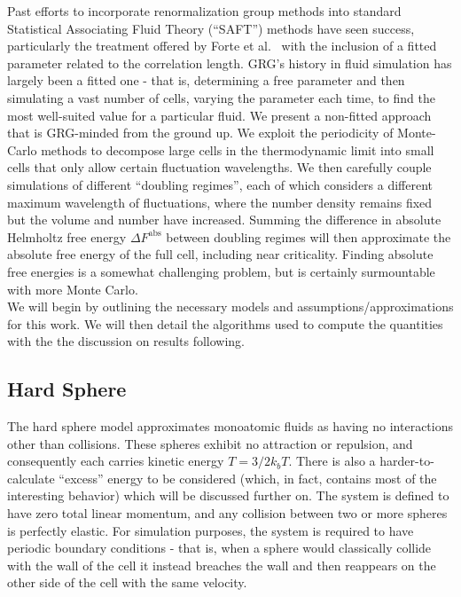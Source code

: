 \documentclass[12pt]{article}
\newcommand{\ignore}[1]{}
\begin{document}
Past efforts to incorporate renormalization group methods into standard Statistical Associating Fluid Theory (``SAFT'') methods have seen success, particularly the treatment offered by Forte et al.~\cite{forte2011application} with the inclusion of a fitted parameter related to the correlation length. GRG's history in fluid simulation has largely been a fitted one - that is, determining a free parameter and then simulating a vast number of cells, varying the parameter each time, to find the most well-suited value for a particular fluid. We present a non-fitted approach that is GRG-minded from the ground up. We exploit the periodicity of Monte-Carlo methods to decompose large cells in the thermodynamic limit into small cells that only allow certain fluctuation wavelengths. We then carefully couple simulations of different ``doubling regimes'', each of which considers a different maximum wavelength of fluctuations, where the number density remains fixed but the volume and number have increased. Summing the difference in absolute Helmholtz free energy $\Delta F^{\text{abs}}$ between doubling regimes will then approximate the absolute free energy of the full cell, including near criticality. Finding absolute free energies is a somewhat challenging problem, but is certainly surmountable with more Monte Carlo. \\
We will begin by outlining the necessary models and assumptions/approximations for this work. We will then detail the algorithms used to compute the quantities with the the discussion on results following. 
\subsection{Hard Sphere}
The hard sphere model approximates monoatomic fluids as having no interactions other than collisions. These spheres exhibit no attraction or repulsion, and consequently each carries kinetic energy $T = 3/2 k_b T$. There is also a harder-to-calculate ``excess'' energy to be considered (which, in fact, contains most of the interesting behavior) which will be discussed further on. The system is defined to have zero total linear momentum, and any collision between two or more spheres is perfectly elastic. For simulation purposes, the system is required to have periodic boundary conditions - that is, when a sphere would classically collide with the wall of the cell it instead breaches the wall and then reappears on the other side of the cell with the same velocity. \\
\ignore{The hard sphere model is incredibly useful; as high temperatures are approached, energy associated with sphere location tends to asymptote for most models [are there any that this isn't true for?] and the kinetic term consequently dominates.}
\end{document}
